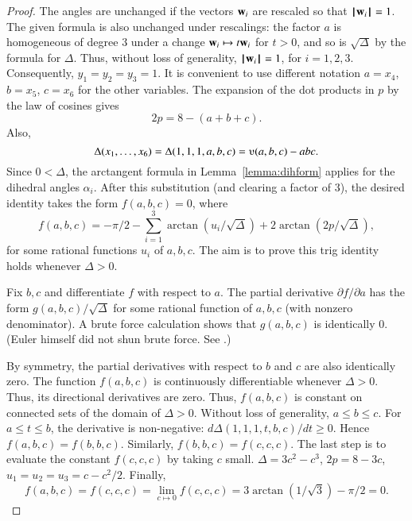 \begin{proof}
The angles are unchanged if the vectors ${\mathbf w}_i$ are rescaled so that
${{\hskip0.1em|\hskip-0.15em|\hskip0.1em}{\mathbf w}_i{\hskip0.1em|\hskip-0.15em|\hskip0.1em}}=1$.  The given formula is also unchanged under rescalings:
the factor $a$ is homogeneous of degree $3$ under a change ${\mathbf w}_i
\mapsto t {\mathbf w}_i$ for $t>0$, and so is $\sqrt{\Delta}$ by the
formula for $\Delta$.  Thus, without loss of generality, ${{\hskip0.1em|\hskip-0.15em|\hskip0.1em}{\mathbf w}_i{\hskip0.1em|\hskip-0.15em|\hskip0.1em}}=1$, for
$i=1,2,3$.  Consequently, $y_1=y_2=y_3=1$.  It is convenient to use
different notation $a=x_4$, $b=x_5$, $c=x_6$ for the other
variables. The expansion of the dot products in $p$ by the law of cosines
gives
    $$2 p = 8 - (a+b+c).$$
Also, $$\Delta(x_1,\ldots,x_6) = \Delta(1,1,1,a,b,c) =
    \ups(a,b,c) - a b c.$$
Since $0 <\Delta$, the arctangent formula
in Lemma~\ref{lemma:dihform} 
applies for the dihedral angles $\alpha_i$.  After
this substitution (and clearing a factor of $3$),  %
the desired identity takes the form $f(a,b,c)=0$, where
    $$
    f(a,b,c)= -\pi/2 - \sum_{i=1}^3\arctan(u_i/\sqrt{\Delta}) +
    2\arctan(2 p/\sqrt{\Delta}),
    $$
for some rational functions $u_i$ of $a,b,c$.   The aim is to prove this trig identity holds whenever $\Delta>0$.

Fix $b,c$ and differentiate $f$ with respect
to $a$.  The partial derivative $\partial f/\partial a$ has the form
$g(a,b,c)/\sqrt{\Delta}$ for some rational function of $a,b,c$ (with
nonzero denominator).  A brute force calculation shows that $g(a,b,c)$ is
identically $0$.  (Euler himself did not shun brute force.  See
\cite{Euler}.)

By symmetry, the partial derivatives with respect to $b$ and $c$ are
also identically zero.  The function $f(a,b,c)$  is continuously
differentiable whenever $\Delta>0$.  Thus, its directional
derivatives are zero.  Thus, $f(a,b,c)$ is constant on connected
sets of the domain of $\Delta>0$.  Without loss of generality, $a\le b\le c$.  For $a\le t\le b$,  the derivative is non-negative:
$d\Delta(1,1,1,t,b,c)/dt\ge 0$. Hence $f(a,b,c)=f(b,b,c)$. 
Similarly,
 $f(b,b,c)=f(c,c,c)$. 
The last step is to evaluate the constant $f(c,c,c)$
by taking $c$ small.
$\Delta=3c^2-c^3$, $2p= 8-3c$,  $u_1=u_2=u_3 = c -c^2/2$.   Finally,
    $$f(a,b,c)= f(c,c,c) = \lim_{c\mapsto0} f(c,c,c) = 
    3 \arctan(1/\sqrt3)-\pi/2 =0.$$
\end{proof}
%






